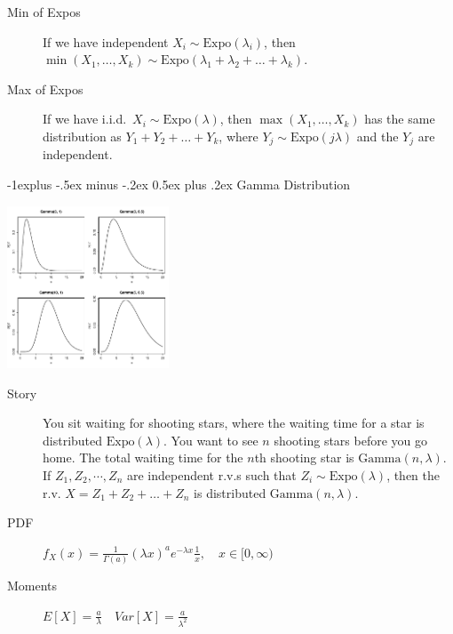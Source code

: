 \documentclass[10pt,landscape]{article}
\makeatletter
\newcommand{\Gam}{\textrm{Gamma}}
\newcommand{\Expo}{\textrm{Expo}}
\renewcommand{\subsection}{\@startsection{subsection}{2}{0mm}%
{-1explus -.5ex minus -.2ex}%
{0.5ex plus .2ex}%
{\normalfont\normalsize\bfseries}}
\makeatother
\begin{document}
\begin{multicols*}{3}
\begin{description}

            \item[Min of Expos] If we have independent $X_i \sim \Expo(\lambda_i)$, then $\min(X_1, \dots, X_k) \sim \Expo(\lambda_1 + \lambda_2 + \dots + \lambda_k)$.
            \item[Max of Expos] If we have i.i.d.~$X_i \sim \Expo(\lambda)$, then $\max(X_1, \dots, X_k)$ has the same distribution as $Y_1+Y_2+\dots+Y_k$, where $Y_j \sim \Expo(j\lambda)$ and the $Y_j$ are independent.
        \end{description}

        \subsection{Gamma Distribution}
        \begin{minipage}{\linewidth}
            \centering
            \includegraphics[width=1.9in]{figures/gammapdfs.pdf}
        \end{minipage}
        \begin{description}
            \item[Story] You sit waiting for shooting stars, where the waiting time for a star is distributed $\Expo(\lambda)$. You want to see $n$ shooting stars before you go home. The total waiting time for the $n$th shooting star is $\Gam(n,\lambda)$. If $Z_1,Z_2,\cdots,Z_n$ are independent r.v.s such that $Z_i \sim \Expo(\lambda)$, then the r.v. $X = Z_1 + Z_2 + \dots + Z_n$ is distributed $\Gam(n, \lambda)$.
            \item[PDF] $f_X(x) = \frac{1}{\Gamma(a)}(\lambda x)^ae^{-\lambda x}\frac{1}{x}, \quad x \in [0, \infty)$
            \item[Moments] $E[X] = \frac{a}{\lambda} \quad Var[X] = \frac{a}{\lambda^2}$


\end{description}
\end{multicols*}
\end{document}
